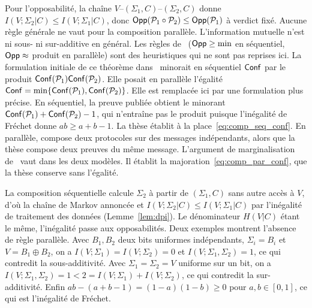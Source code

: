 \begin{sloppypar}
\begin{remark}\label{rem:composition_opp}
Pour l'opposabilit\'e, la cha\^ine $V$--$(\Sigma_1,C)$--$(\Sigma_2,C)$ donne
$I(V;\Sigma_2|C) \leq I(V;\Sigma_1|C)$, donc
$\mathsf{Opp}(\mathcal{P}_1\circ\mathcal{P}_2) \leq \mathsf{Opp}(\mathcal{P}_1)$ \`a verdict
fix\'e. Aucune r\`egle g\'en\'erale ne vaut pour la composition parall\`ele.
L'information mutuelle n'est ni sous- ni sur-additive en g\'en\'eral. Les
r\`egles de~\cite{MINKA2026CLO} ($\mathsf{Opp} \geq \min$ en s\'equentiel,
$\mathsf{Opp} \approx$ produit en parall\`ele) sont des heuristiques qui ne sont pas
reprises ici. La formulation initiale de ce th\'eor\`eme dans~\cite{MINKA2026CLO} minorait en s\'equentiel
$\mathsf{Conf}$ par le produit $\mathsf{Conf}(\mathcal{P}_1)\mathsf{Conf}(\mathcal{P}_2)$. Elle posait en parall\`ele
l'\'egalit\'e $\mathsf{Conf} = \min\{\mathsf{Conf}(\mathcal{P}_1), \mathsf{Conf}(\mathcal{P}_2)\}$. Elle est remplac\'ee
ici par une formulation plus pr\'ecise. En s\'equentiel, la preuve publi\'ee obtient le minorant
$\mathsf{Conf}(\mathcal{P}_1)+\mathsf{Conf}(\mathcal{P}_2)-1$, qui n'entra\^ine pas le produit puisque
l'in\'egalit\'e de Fr\'echet donne $ab \geq a+b-1$. La th\`ese \'etablit \`a la
place~\eqref{eq:comp_seq_conf}. En parall\`ele, \cite{MINKA2026CLO} compose deux protocoles sur des messages ind\'ependants, alors que la th\`ese compose deux preuves du m\^eme message. L'argument de marginalisation
de~\cite{MINKA2026CLO} vaut dans les deux mod\`eles. Il \'etablit la majoration~\eqref{eq:comp_par_conf}, que la th\`ese
conserve sans l'\'egalit\'e.
\end{remark}

\begin{Preuve}
La composition s\'equentielle calcule $\Sigma_2$ \`a partir de $(\Sigma_1,C)$ sans
autre acc\`es \`a $V$, d'o\`u la cha\^ine de Markov annonc\'ee et
$I(V;\Sigma_2|C) \leq I(V;\Sigma_1|C)$ par l'in\'egalit\'e de traitement des donn\'ees
(Lemme~\ref{lem:dpi}). Le d\'enominateur $H(V|C)$ \'etant le m\^eme, l'in\'egalit\'e
passe aux opposabilit\'es. Deux exemples montrent l'absence de r\`egle
parall\`ele. Avec $B_1, B_2$ deux bits uniformes ind\'ependants, $\Sigma_i = B_i$ et
$V = B_1 \oplus B_2$, on a $I(V;\Sigma_1) = I(V;\Sigma_2) = 0$ et
$I(V;\Sigma_1,\Sigma_2) = 1$, ce qui contredit la sous-additivit\'e. Avec
$\Sigma_1 = \Sigma_2 = V$ uniforme sur un bit, on a $I(V;\Sigma_1,\Sigma_2) = 1 < 2
= I(V;\Sigma_1) + I(V;\Sigma_2)$, ce qui contredit la sur-additivit\'e. Enfin
$ab - (a+b-1) = (1-a)(1-b) \geq 0$ pour $a, b \in [0,1]$, ce qui est
l'in\'egalit\'e de Fr\'echet.
\end{Preuve}


\end{sloppypar}
